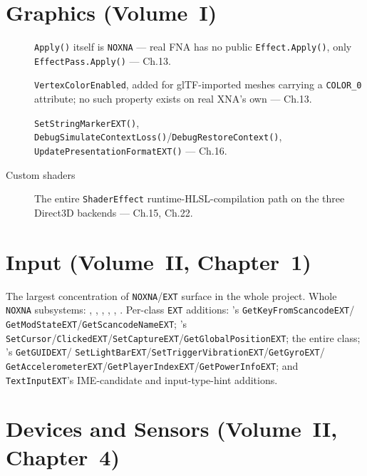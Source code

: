 \section{Graphics (Volume~I)}

\begin{description}
\item[] \texttt{Apply()} itself is \texttt{NOXNA} --- real FNA has no public
  \texttt{Effect.Apply()}, only \texttt{EffectPass.Apply()} --- Ch.13.
\item[] \texttt{VertexColorEnabled}, added for glTF-imported meshes
  carrying a \texttt{COLOR\_0} attribute; no such property exists on real XNA's own
   --- Ch.13.
\item[] \texttt{SetStringMarkerEXT()},
  \texttt{DebugSimulateContextLoss()}/\texttt{DebugRestoreContext()},
  \texttt{UpdatePresentationFormatEXT()} --- Ch.16.
\item[Custom shaders] The entire \texttt{ShaderEffect} runtime-HLSL-compilation path on the
  three Direct3D backends --- Ch.15, Ch.22.
\end{description}

\section{Input (Volume~II, Chapter~1)}

The largest concentration of \texttt{NOXNA}/\texttt{EXT} surface in the whole project. Whole
\texttt{NOXNA} subsystems: , ,
, , , . Per-class
\texttt{EXT} additions: 's \texttt{GetKeyFromScancodeEXT}/%
\texttt{GetModStateEXT}/\texttt{GetScancodeNameEXT}; 's
\texttt{SetCursor}/\texttt{ClickedEXT}/\texttt{SetCaptureEXT}/\texttt{GetGlobalPositionEXT};
the entire  class; 's \texttt{GetGUIDEXT}/%
\texttt{SetLightBarEXT}/\texttt{SetTriggerVibrationEXT}/\texttt{GetGyroEXT}/%
\texttt{GetAccelerometerEXT}/\texttt{GetPlayerIndexEXT}/\texttt{GetPowerInfoEXT}; and
\texttt{TextInputEXT}'s IME-candidate and input-type-hint additions.

\section{Devices and Sensors (Volume~II, Chapter~4)}

